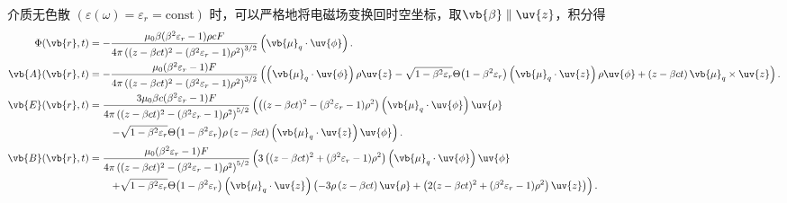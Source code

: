 \begin{example}
	介质无色散 \((\varepsilon(\omega) = \varepsilon_{r} = \text{const})\) 时，可以严格地将电磁场变换回时空坐标，取\(\vb{\beta}\parallel\uv{z}\)，积分得
	\begin{align*}
		\Phi(\vb{r}, t) &= -\frac{\mu_{0} \beta (\beta^{2} \varepsilon_{r} - 1) \rho c F}{4\pi \left( (z - \beta c t)^{2} - (\beta^{2} \varepsilon_{r} - 1) \rho^{2} \right)^{3/2}} \left( \vb{\mu}_{q} \cdot \uv{\phi} \right) . \\
		\vb{A}(\vb{r}, t) &= -\frac{\mu_{0} (\beta^{2} \varepsilon_{r} - 1)F}{4\pi \left( (z - \beta c t)^{2} - (\beta^{2} \varepsilon_{r} - 1) \rho^{2} \right)^{3/2}} \left( \left( \vb{\mu}_{q} \cdot \uv{\phi} \right) \rho \uv{z} - \sqrt{1 - \beta^{2} \varepsilon_{r}} \Theta\bigl(1 - \beta^{2} \varepsilon_{r}\bigr) \left( \vb{\mu}_{q} \cdot \uv{z} \right) \rho \uv{\phi} + \left( z - \beta c t \right) \vb{\mu}_{q} \times \uv{z} \right). \\
		\vb{E}(\vb{r}, t) &= \frac{3\mu_{0} \beta c (\beta^{2} \varepsilon_{r} - 1) F }{4\pi \left( (z - \beta c t)^{2} - (\beta^{2} \varepsilon_{r} - 1) \rho^{2} \right)^{5/2}} \left( \left( (z - \beta c t)^{2} - (\beta^{2} \varepsilon_{r} - 1) \rho^{2} \right) \left( \vb{\mu}_{q} \cdot \uv{\phi} \right) \uv{\rho} \right.\\
		&\quad\quad\left. - \sqrt{1 - \beta^{2} \varepsilon_{r}} \Theta\bigl(1 - \beta^{2} \varepsilon_{r}\bigr) \rho \left( z - \beta c t \right) \left( \vb{\mu}_{q} \cdot \uv{z} \right) \uv{\phi} \right). \\
		\vb{B}(\vb{r}, t) &= \frac{\mu_{0} (\beta^{2} \varepsilon_{r} - 1) F }{4\pi \left( (z - \beta c t)^{2} - (\beta^{2} \varepsilon_{r} - 1) \rho^{2} \right)^{5/2}} \left( 3 \left( (z - \beta c t)^{2} + (\beta^{2} \varepsilon_{r} - 1) \rho^{2} \right) \left( \vb{\mu}_{q} \cdot \uv{\phi} \right) \uv{\phi} \right.\\
		&\quad\quad\left. + \sqrt{1 - \beta^{2} \varepsilon_{r}} \Theta\bigl(1 - \beta^{2} \varepsilon_{r}\bigr) \left( \vb{\mu}_{q} \cdot \uv{z} \right) \left( -3 \rho \left( z - \beta c t \right) \uv{\rho} + \left( 2 (z - \beta c t)^{2} + (\beta^{2} \varepsilon_{r} - 1) \rho^{2} \right) \uv{z} \right) \right).
	\end{align*}
\end{example}
